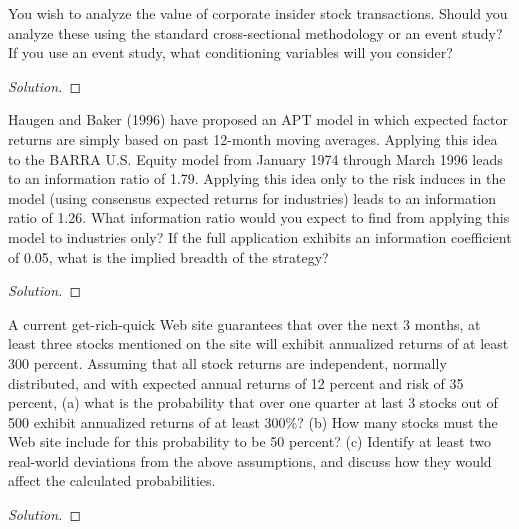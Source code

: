 \begin{problem}{12.6}
  You wish to analyze the value of corporate insider stock transactions. Should you analyze these using the standard cross-sectional methodology or an event study? If you use an event study, what conditioning variables will you consider?
\end{problem}

\begin{proof}[Solution]
\end{proof}

\begin{problem}{12.7}
  Haugen and Baker (1996) have proposed an APT model in which expected factor returns are simply based on past 12-month moving averages. Applying this idea to the BARRA U.S. Equity model from January 1974 through March 1996 leads to an information ratio of 1.79. Applying this idea only to the risk induces in the model (using consensus expected returns for industries) leads to an information ratio of 1.26. What information ratio would you expect to find from applying this model to industries only? If the full application exhibits an information coefficient of 0.05, what is the implied breadth of the strategy?
\end{problem}

\begin{proof}[Solution]
\end{proof}

\begin{problem}{12.8}
  A current get-rich-quick Web site guarantees that over the next 3 months, at least three stocks mentioned on the site will exhibit annualized returns of at least 300 percent. Assuming that all stock returns are independent, normally distributed, and with expected annual returns of 12 percent and risk of 35 percent, (a) what is the probability that over one quarter at last 3 stocks out of 500 exhibit annualized returns of at least 300\%? (b) How many stocks must the Web site include for this probability to be 50 percent? (c) Identify at least two real-world deviations from the above assumptions, and discuss how they would affect the calculated probabilities.
\end{problem}

\begin{proof}[Solution]
\end{proof}
